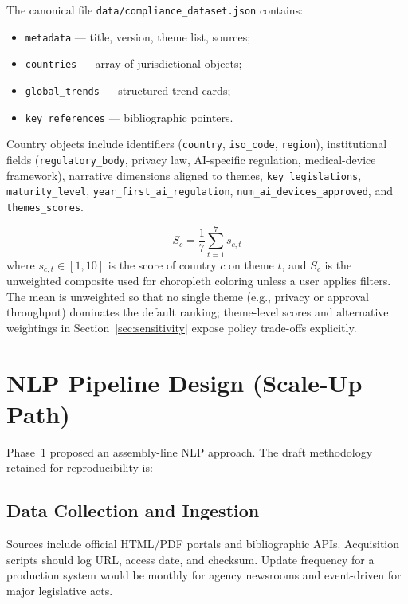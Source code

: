 The canonical file \texttt{data/compliance\_dataset.json} contains:
\begin{itemize}[noitemsep]
  \item \texttt{metadata} --- title, version, theme list, sources;
  \item \texttt{countries} --- array of jurisdictional objects;
  \item \texttt{global\_trends} --- structured trend cards;
  \item \texttt{key\_references} --- bibliographic pointers.
\end{itemize}

Country objects include identifiers (\texttt{country}, \texttt{iso\_code}, \texttt{region}), institutional fields (\texttt{regulatory\_body}, privacy law, AI-specific regulation, medical-device framework), narrative dimensions aligned to themes, \texttt{key\_legislations}, \texttt{maturity\_level}, \texttt{year\_first\_ai\_regulation}, \texttt{num\_ai\_devices\_approved}, and \texttt{themes\_scores}.

\begin{equation}
\label{eq:composite}
S_c = \frac{1}{7} \sum_{t=1}^{7} s_{c,t}
\end{equation}
where $s_{c,t} \in [1,10]$ is the score of country $c$ on theme $t$, and $S_c$ is the unweighted composite used for choropleth coloring unless a user applies filters.
The mean is unweighted so that no single theme (e.g., privacy or approval throughput) dominates the default ranking; theme-level scores and alternative weightings in Section~\ref{sec:sensitivity} expose policy trade-offs explicitly.

\section{NLP Pipeline Design (Scale-Up Path)}
\label{sec:nlp}

Phase~1 proposed an assembly-line NLP approach. The draft methodology retained for reproducibility is:

\subsection{Data Collection and Ingestion}

Sources include official HTML/PDF portals and bibliographic APIs. Acquisition scripts should log URL, access date, and checksum. Update frequency for a production system would be monthly for agency newsrooms and event-driven for major legislative acts.

